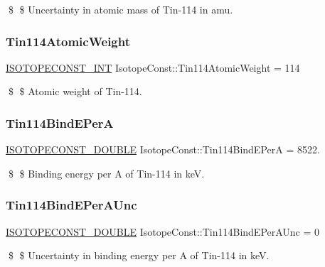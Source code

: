 \$ \$ Uncertainty in atomic mass of Tin-\/114 in amu. \mbox{\label{group___isotope_const-_tin-_sn114_ga7f23e22efb1cd386373710863b415dbd}} 
\subsubsection{\texorpdfstring{Tin114\+Atomic\+Weight}{Tin114AtomicWeight}}
{\footnotesize\ttfamily \mbox{\hyperlink{group___isotope_const-_macros_ga5f18360b3e99483a35c32d789e62621c}{I\+S\+O\+T\+O\+P\+E\+C\+O\+N\+S\+T\+\_\+\+I\+NT}} Isotope\+Const\+::\+Tin114\+Atomic\+Weight = 114}

\$ \$ Atomic weight of Tin-\/114. \mbox{\label{group___isotope_const-_tin-_sn114_ga5f007904b03671242da016574adbd5fb}} 
\subsubsection{\texorpdfstring{Tin114\+Bind\+E\+PerA}{Tin114BindEPerA}}
{\footnotesize\ttfamily \mbox{\hyperlink{group___isotope_const-_macros_ga8f45a7272ce02c0b4c65c44636ed719a}{I\+S\+O\+T\+O\+P\+E\+C\+O\+N\+S\+T\+\_\+\+D\+O\+U\+B\+LE}} Isotope\+Const\+::\+Tin114\+Bind\+E\+PerA = 8522.}

\$ \$ Binding energy per A of Tin-\/114 in keV. \mbox{\label{group___isotope_const-_tin-_sn114_ga2f438544ca4c41a0bbf49faf8c1c60ef}} 
\subsubsection{\texorpdfstring{Tin114\+Bind\+E\+Per\+A\+Unc}{Tin114BindEPerAUnc}}
{\footnotesize\ttfamily \mbox{\hyperlink{group___isotope_const-_macros_ga8f45a7272ce02c0b4c65c44636ed719a}{I\+S\+O\+T\+O\+P\+E\+C\+O\+N\+S\+T\+\_\+\+D\+O\+U\+B\+LE}} Isotope\+Const\+::\+Tin114\+Bind\+E\+Per\+A\+Unc = 0}

\$ \$ Uncertainty in binding energy per A of Tin-\/114 in keV. \mbox{\label{group___isotope_const-_tin-_sn114_gaf56c7b26fee3b7a81e6e309fcfee88e8}} 
